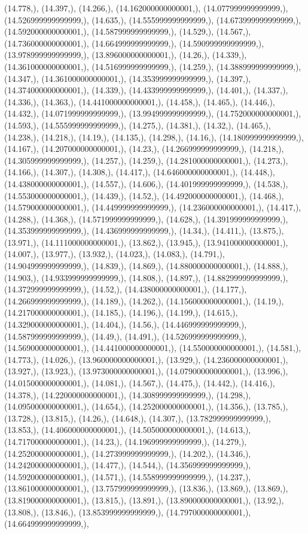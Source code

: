 \documentclass{article}
\begin{document}
(14.778,), (14.397,), (14.266,), (14.162000000000001,), (14.077999999999999,), (14.526999999999999,), (14.635,), (14.555999999999999,), (14.673999999999999,), (14.592000000000001,), (14.587999999999999,), (14.529,), (14.567,), (14.736000000000001,), (14.664999999999999,), (14.590999999999999,), (13.978999999999999,), (13.896000000000001,), (14.26,), (14.339,), (14.361000000000001,), (14.516999999999999,), (14.259,), (14.388999999999999,), (14.347,), (14.361000000000001,), (14.353999999999999,), (14.397,), (14.374000000000001,), (14.339,), (14.433999999999999,), (14.401,), (14.337,), (14.336,), (14.363,), (14.441000000000001,), (14.458,), (14.465,), (14.446,), (14.432,), (14.071999999999999,), (13.994999999999999,), (14.752000000000001,), (14.593,), (14.555999999999999,), (14.275,), (14.381,), (14.32,), (14.465,), (14.238,), (14.218,), (14.19,), (14.135,), (14.298,), (14.16,), (14.180999999999999,), (14.167,), (14.207000000000001,), (14.23,), (14.266999999999999,), (14.218,), (14.305999999999999,), (14.257,), (14.259,), (14.281000000000001,), (14.273,), (14.166,), (14.307,), (14.308,), (14.417,), (14.646000000000001,), (14.448,), (14.438000000000001,), (14.557,), (14.606,), (14.401999999999999,), (14.538,), (14.553000000000001,), (14.439,), (14.52,), (14.492000000000001,), (14.468,), (14.579000000000001,), (14.449999999999999,), (14.236000000000001,), (14.417,), (14.288,), (14.368,), (14.571999999999999,), (14.628,), (14.391999999999999,), (14.353999999999999,), (14.436999999999999,), (14.34,), (14.411,), (13.875,), (13.971,), (14.111000000000001,), (13.862,), (13.945,), (13.941000000000001,), (14.007,), (13.977,), (13.932,), (14.023,), (14.083,), (14.791,), (14.904999999999999,), (14.839,), (14.869,), (14.880000000000001,), (14.888,), (14.903,), (14.933999999999999,), (14.808,), (14.897,), (14.882999999999999,), (14.372999999999999,), (14.52,), (14.438000000000001,), (14.177,), (14.266999999999999,), (14.189,), (14.262,), (14.156000000000001,), (14.19,), (14.217000000000001,), (14.185,), (14.196,), (14.199,), (14.615,), (14.329000000000001,), (14.404,), (14.56,), (14.446999999999999,), (14.587999999999999,), (14.49,), (14.491,), (14.526999999999999,), (14.569000000000001,), (14.441000000000001,), (14.550000000000001,), (14.581,), (14.773,), (14.026,), (13.960000000000001,), (13.929,), (14.236000000000001,), (13.927,), (13.923,), (13.973000000000001,), (14.079000000000001,), (13.996,), (14.015000000000001,), (14.081,), (14.567,), (14.475,), (14.442,), (14.416,), (14.378,), (14.220000000000001,), (14.308999999999999,), (14.298,), (14.095000000000001,), (14.654,), (14.252000000000001,), (14.356,), (13.785,), (13.728,), (13.815,), (14.26,), (14.648,), (14.307,), (13.782999999999999,), (13.853,), (14.406000000000001,), (14.505000000000001,), (14.613,), (14.717000000000001,), (14.23,), (14.196999999999999,), (14.279,), (14.252000000000001,), (14.273999999999999,), (14.202,), (14.346,), (14.242000000000001,), (14.477,), (14.544,), (14.356999999999999,), (14.592000000000001,), (14.571,), (14.558999999999999,), (14.237,), (13.861000000000001,), (13.757999999999999,), (13.836,), (13.869,), (13.869,), (13.819000000000001,), (13.815,), (13.891,), (13.890000000000001,), (13.92,), (13.808,), (13.846,), (13.853999999999999,), (14.797000000000001,), (14.664999999999999,), 
\end{document}
